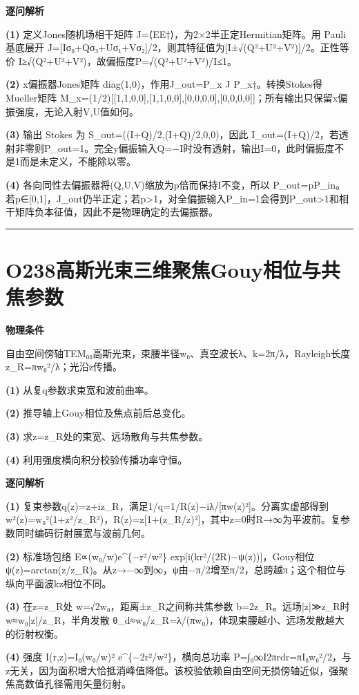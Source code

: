\documentclass[UTF8,a4paper,11pt,oneside,openany]{ctexbook}
\begin{document}
\par\medskip\noindent\textbf{逐问解析}
\par\noindent\textbf{(1)} 定义Jones随机场相干矩阵 J=⟨EE†⟩，为2×2半正定Hermitian矩阵。用 Pauli 基底展开 J=[Iσ₀+Qσ₃+Uσ₁+Vσ₂]/2，则其特征值为[I±√(Q²+U²+V²)]/2。正性等价 I≥√(Q²+U²+V²)，故偏振度P=√(Q²+U²+V²)/I≤1。
\par\noindent\textbf{(2)} x偏振器Jones矩阵 diag(1,0)，作用J\_out=P\_x J P\_x†。转换Stokes得 Mueller矩阵 M\_x=(1/2)[[1,1,0,0],[1,1,0,0],[0,0,0,0],[0,0,0,0]]；所有输出只保留x偏振强度，无论入射V,U值如何。
\par\noindent\textbf{(3)} 输出 Stokes 为 S\_out=((I+Q)/2,(I+Q)/2,0,0)，因此 I\_out=(I+Q)/2，若透射非零则P\_out=1。完全y偏振输入Q=−I时没有透射，输出I=0，此时偏振度不是1而是未定义，不能除以零。
\par\noindent\textbf{(4)} 各向同性去偏振器将(Q,U,V)缩放为p倍而保持I不变，所以 P\_out=pP\_in。若p∈[0,1]，J\_out仍半正定；若p>1，对全偏振输入P\_in=1会得到P\_out>1和相干矩阵负本征值，因此不是物理确定的去偏振器。

\par\bigskip\hrule\bigskip
\section*{O238\quad 高斯光束三维聚焦Gouy相位与共焦参数}
\textbf{物理条件}\par 自由空间傍轴TEM₀₀高斯光束，束腰半径w₀、真空波长λ、k=2π/λ，Rayleigh长度z\_R=πw₀²/λ；光沿z传播。
\par\noindent\textbf{(1)} 从复q参数求束宽和波前曲率。
\par\noindent\textbf{(2)} 推导轴上Gouy相位及焦点前后总变化。
\par\noindent\textbf{(3)} 求z=z\_R处的束宽、远场散角与共焦参数。
\par\noindent\textbf{(4)} 利用强度横向积分校验传播功率守恒。

\par\medskip\noindent\textbf{逐问解析}
\par\noindent\textbf{(1)} 复束参数q(z)=z+iz\_R，满足1/q=1/R(z)−iλ/[πw(z)²]。分离实虚部得到 w²(z)=w₀²(1+z²/z\_R²)，R(z)=z[1+(z\_R/z)²]，其中z=0时R→∞为平波前。复参数同时编码衍射展宽与波前几何。
\par\noindent\textbf{(2)} 标准场包络 E∝(w₀/w)e\textasciicircum{}\{−r²/w²\} exp[i(kr²/(2R)−ψ(z))]，Gouy相位 ψ(z)=arctan(z/z\_R)。从z→−∞到∞，ψ由−π/2增至π/2，总跨越π；这个相位与纵向平面波kz相位不同。
\par\noindent\textbf{(3)} 在z=z\_R处 w=√2w₀，距离±z\_R之间称共焦参数 b=2z\_R。远场|z|≫z\_R时 w≈w₀|z|/z\_R，半角发散 θ\_d≈w₀/z\_R=λ/(πw₀)，体现束腰越小、远场发散越大的衍射权衡。
\par\noindent\textbf{(4)} 强度 I(r,z)=I₀(w₀/w)² e\textasciicircum{}\{−2r²/w²\}，横向总功率 P=∫₀∞I2πrdr=πI₀w₀²/2，与z无关，因为面积增大恰抵消峰值降低。该校验依赖自由空间无损傍轴近似，强聚焦高数值孔径需用矢量衍射。
\end{document}
